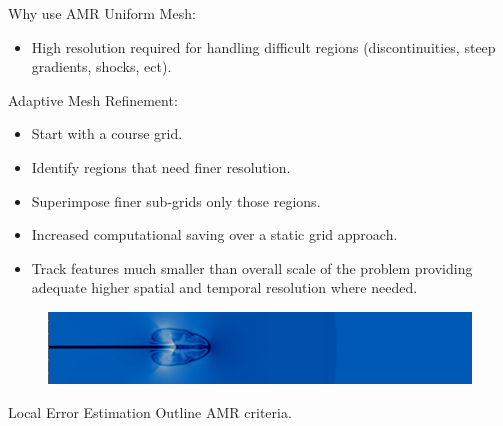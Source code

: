 \documentclass{beamer}
\begin{document}
\begin{frame}
\begin{block}{Why use AMR}
Uniform Mesh:
\begin{itemize}
\item High resolution required for handling difficult regions (discontinuities, steep gradients, shocks, ect).
\end{itemize}
Adaptive Mesh Refinement:
\begin{itemize}
\item Start with a course grid.
\item Identify regions that need finer resolution.
\item Superimpose finer sub-grids only those regions.
\item Increased computational saving over a static grid approach. 
\item  Track features much smaller than overall scale of the problem providing adequate higher spatial and temporal resolution where needed.    
\end{itemize}
\end{block}
\begin{figure}
\centering
\includegraphics[width=\linewidth]{images/MHD_jet.png}
\end{figure}
\end{frame}
\begin{frame}
\begin{block}{Local Error Estimation}
Outline AMR criteria.
\end{block}
\end{frame}
\end{document}
